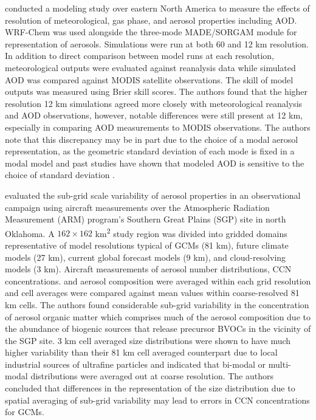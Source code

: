 \textcite{crippa_impact_2017} conducted a modeling study over eastern North America to measure the effects of resolution of meteorological, gas phase, and aerosol properties including AOD. WRF-Chem was used alongside the three-mode MADE/SORGAM module for representation of aerosols. Simulations were run at both 60 and 12 km resolution. In addition to direct comparison between model runs at each resolution, meteorological outputs were evaluated against reanalysis data while simulated AOD was compared against MODIS satellite observations. The skill of model outputs was measured using Brier skill scores. The authors found that the higher resolution 12 km simulations agreed more closely with meteorological reanalysis and AOD observations, however, notable differences were still present at 12 km, especially in comparing AOD measurements to MODIS observations. The authors note that this discrepancy may be in part due to the choice of a modal aerosol representation, as the geometric standard deviation of each mode is fixed in a modal model and past studies have shown that modeled AOD is sensitive to the choice of standard deviation \parencite{brock_aerosol_2016, mann_intercomparison_2012}. 

\textcite{fast_using_2022} evaluated the sub-grid scale variability of aerosol properties in an observational campaign using aircraft measurements over the Atmospheric Radiation Measurement (ARM) program's Southern Great Plains (SGP) site in north Oklahoma. A $162\times162$ \si{km^2} study region was divided into gridded domains representative of model resolutions typical of GCMs (81 km), future climate models (27 km), current global forecast models (9 km), and cloud-resolving models (3 km). Aircraft measurements of aerosol number distributions, CCN concentrations. and aerosol composition were averaged within each grid resolution and cell averages were compared against mean values within coarse-resolved 81 km cells. The authors found considerable sub-grid variability in the concentration of aerosol organic matter which comprises much of the aerosol composition due to the abundance of biogenic sources that release precursor BVOCs in the vicinity of the SGP site. 3 km cell averaged size distributions were shown to have much higher variability than their 81 km cell averaged counterpart due to local industrial sources of ultrafine particles and indicated that bi-modal or multi-modal distributions were averaged out at coarse resolution. The authors concluded that differences in the representation of the size distribution due to spatial averaging of sub-grid variability may lead to errors in CCN concentrations for GCMs. 

